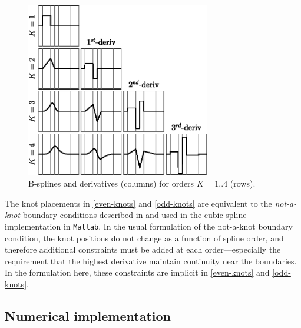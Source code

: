 \documentclass{ametsoc}
\begin{document}
\begin{figure}
  \centerline{\includegraphics[width=19pc,angle=0]{bsplines.eps}}
  \caption{B-splines and derivatives (columns) for orders $K=1..4$ (rows).}
  \label{bsplines}
\end{figure}

The knot placements in \eqref{even-knots} and \eqref{odd-knots} are equivalent to the \textit{not-a-knot} boundary conditions described in \citet{deboor1978-book} and used in the cubic spline implementation in \texttt{Matlab}. In the usual formulation of the not-a-knot boundary condition, the knot positions do not change as a function of spline order, and therefore additional constraints must be added at each order---especially the requirement that the highest derivative maintain continuity near the boundaries. In the formulation here, these constraints are implicit in  \eqref{even-knots} and \eqref{odd-knots}.


\subsection{Numerical implementation}
\end{document}
